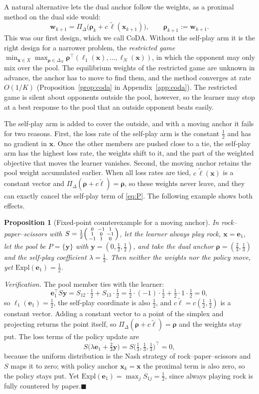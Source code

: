 \documentclass{article}
\theoremstyle{plain}
\newtheorem{proposition}[theorem]{Proposition}
\theoremstyle{remark}
\newcommand{\Expl}{\mathrm{Expl}}
\newcommand{\Proj}{\Pi}
\newcommand{\simplex}{\Delta}
\newcommand{\bx}{{\bm{x}}}
\newcommand{\by}{{\bm{y}}}
\newcommand{\bw}{{\bm{w}}}
\newcommand{\be}{{\bm{e}}}
\newcommand{\brho}{{\bm{\rho}}}
\newcommand{\bell}{{\bm{\ell}}}
\newcommand{\aug}{\tilde{\bell}}
\newcommand{\coda}{CoDA}
\begin{document}
A natural alternative lets the dual anchor follow the weights, as a proximal method on the dual side would:
\[
\bw_{k+1}=\Proj_\simplex\big(\brho_k+c\,\aug(\bx_{k+1})\big),\qquad\brho_{k+1}:=\bw_{k+1}.
\]
This was our first design, which we call \coda{}. Without the self-play arm it is the right design for a narrower problem, the \emph{restricted game} $\min_{\bx\in X}\max_{\brho\in\simplex_N}\brho^\top(\ell_1(\bx),\dots,\ell_N(\bx))$, in which the opponent may only mix over the pool. The equilibrium weights of the restricted game are unknown in advance, the anchor has to move to find them, and the method converges at rate $O(1/K)$ (Proposition~\ref{prop:coda} in Appendix~\ref{app:coda}). The restricted game is silent about opponents outside the pool, however, so the learner may stop at a best response to the pool that an outside opponent beats easily.

The self-play arm is added to cover the outside, and with a moving anchor it fails for two reasons. First, the loss rate of the self-play arm is the constant $\tfrac12$ and has no gradient in $\bx$. Once the other members are pushed close to a tie, the self-play arm has the highest loss rate, the weights shift to it, and the part of the weighted objective that moves the learner vanishes. Second, the moving anchor retains the pool weight accumulated earlier. When all loss rates are tied, $c\,\aug(\bx)$ is a constant vector and $\Proj_\simplex(\brho+c\aug)=\brho$, so these weights never leave, and they can exactly cancel the self-play term of \eqref{eq:P}. The following example shows both effects.

\begin{proposition}[Fixed-point counterexample for a moving anchor]
\label{prop:rps}
In rock--paper--scissors with $S=\tfrac12\begin{psmallmatrix}0&-1&1\\1&0&-1\\-1&1&0\end{psmallmatrix}$, let the learner always play rock, $\bx=\be_1$, let the pool be $P=\{\by\}$ with $\by=(0,\tfrac12,\tfrac12)$, and take the dual anchor $\brho=(\tfrac23,\tfrac13)$ and the self-play coefficient $\lambda=\tfrac13$. Then neither the weights nor the policy move, yet $\Expl(\be_1)=\tfrac12$.
\end{proposition}
\textit{Verification.} The pool member ties with the learner:
\[
\be_1^\top S\by=S_{12}\cdot\tfrac12+S_{13}\cdot\tfrac12=\tfrac12\cdot(-1)\cdot\tfrac12+\tfrac12\cdot1\cdot\tfrac12=0 ,
\]
so $\ell_1(\be_1)=\tfrac12$, the self-play coordinate is also $\tfrac12$, and $c\aug=c(\tfrac12,\tfrac12)$ is a constant vector. Adding a constant vector to a point of the simplex and projecting returns the point itself, so $\Proj_\simplex(\brho+c\aug)=\brho$ and the weights stay put. The loss terms of the policy update are
\[
S\big(\lambda \be_1+\tfrac23\by\big)=S\big(\tfrac13,\tfrac13,\tfrac13\big)^\top=0 ,
\]
because the uniform distribution is the Nash strategy of rock--paper--scissors and $S$ maps it to zero; with policy anchor $\bx_k=\bx$ the proximal term is also zero, so the policy stays put. Yet $\Expl(\be_1)=\max_jS_{1j}=\tfrac12$, since always playing rock is fully countered by paper.\hfill$\blacksquare$
\end{document}
